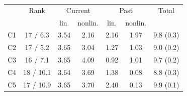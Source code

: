 \begin{tabular}{@{}lcccccc@{}}
\toprule
 & Rank & \multicolumn{2}{c}{Current} & \multicolumn{2}{c}{Past} & Total \\
 & & lin. & nonlin. & lin. & nonlin. & \\
\midrule
C1 & 17 / 6.3 & 3.54 & 2.16 & 2.16 & 1.97 & 9.8 (0.3) \\
C2 & 17 / 5.2 & 3.65 & 3.04 & 1.27 & 1.03 & 9.0 (0.2) \\
C3 & 16 / 7.1 & 3.65 & 4.09 & 0.92 & 1.01 & 9.7 (0.2) \\
C4 & 18 / 10.1 & 3.64 & 3.69 & 1.38 & 0.08 & 8.8 (0.3) \\
C5 & 17 / 10.9 & 3.65 & 3.70 & 2.40 & 0.13 & 9.9 (0.1) \\
\bottomrule
\end{tabular}
